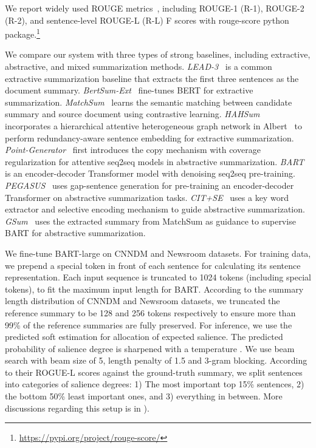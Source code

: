 \documentclass[11pt]{article}
\newcommand{\stitle}[1]{\vspace{1ex} \noindent{\bf #1.}}
\begin{document}
\stitle{Metrics}
We report widely used ROUGE metrics~\cite{lin2004rouge}, including ROUGE-1 (R-1), ROUGE-2 (R-2), and sentence-level ROUGE-L (R-L) F scores with rouge-score python package.\footnote{\url{https://pypi.org/project/rouge-score/}}

\stitle{Baselines}
We compare our system with three types of strong baselines, including extractive, abstractive, and mixed summarization methods.
\textit{LEAD-3}~\cite{see2017get} is a common extractive summarization baseline that extracts the first three sentences as the document summary.
\textit{BertSum-Ext}~\cite{liu2019fine} fine-tunes BERT for extractive summarization.
\textit{MatchSum}~\cite{zhong2020extractive} learns the semantic matching between candidate summary and source document using contrastive learning.
\textit{HAHSum}~\cite{jia2020neural} incorporates a hierarchical attentive heterogeneous graph network in Albert~\cite{lan2019albert} to perform redundancy-aware sentence embedding for extractive summarization.
\textit{Point-Generator}~\cite{see2017get} first introduces the copy mechanism with coverage regularization for attentive seq2seq models in abstractive summarization. 
\textit{BART}~\cite{lewis2020bart} is an encoder-decoder Transformer model with denoising seq2seq pre-training.
\textit{PEGASUS}~\cite{zhang2020pegasus} uses gap-sentence generation for pre-training an encoder-decoder Transformer on abstractive summarization tasks.
\textit{CIT+SE}~\cite{saito2020abstractive} uses a key word extractor and selective encoding mechanism to guide abstractive summarization.
\textit{GSum}~\cite{dou2021gsum} uses the extracted summary from MatchSum as guidance to supervise BART for abstractive summarization.




\stitle{Implementation details}
We fine-tune BART-large on CNNDM and Newsroom datasets.
For training data, we prepend a special token in front of each sentence for calculating its sentence representation.
Each input sequence is truncated to 1024 tokens (including special tokens), to fit the maximum input length for BART.
According to the summary length distribution of CNNDM and Newsroom datasets, we truncated the reference summary to be 128 and 256 tokens respectively to ensure more than 99\% of the reference summaries are fully preserved.
For inference, we use the predicted soft estimation for allocation of expected salience.
The predicted probability of salience degree is sharpened with a temperature .
We use beam search with beam size of 5, length penalty of 1.5 and 3-gram blocking.
According to their ROGUE-L  scores against the ground-truth summary, we split sentences into  categories of salience degrees: 1) The most important top 15\% sentences, 2) the bottom 50\% least important ones, and 3) everything in between. More discussions regarding this setup is in ).
\end{document}
